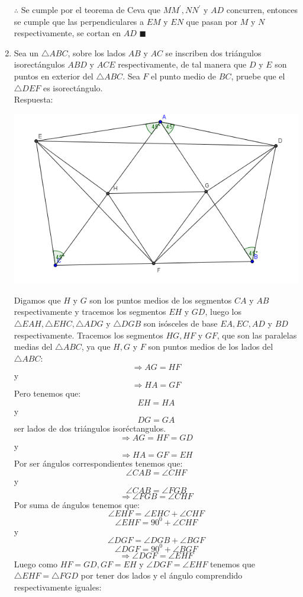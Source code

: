 \documentclass{book}
\begin{document}
\begin{enumerate}
$\therefore$ Se cumple por el teorema de Ceva que $MM^{'},NN^{'}$ y $AD$ concurren, entonces se cumple que las perpendiculares a $EM$ y $EN$ que pasan por $M$ y $N$ respectivamente, se cortan en $AD$ $\blacksquare$\\
				\item Sea un $\triangle ABC$, sobre los lados $AB$ y $AC$ se inscriben dos triángulos isorectángulos $ABD$ y $ACE$ respectivamente, de tal manera que $D$ y $E$ son puntos en exterior del $\triangle ABC$. Sea $F$ el punto medio de $BC$, pruebe que el $\triangle DEF$ es isorectángulo.\\
					Respuesta:
					\begin{center}
						\includegraphics[scale=1]{imagenes/Geometria/20.png}
					\end{center}
					Digamos que $H$ y $G$  son los puntos medios de los segmentos $CA$ y $AB$ respectivamente y tracemos los segmentos $EH$ y $GD$, luego los $\triangle EAH,\triangle EHC,\triangle ADG$ y $\triangle DGB$ son isósceles de base $EA,EC,AD$ y $BD$ respectivamente.
Tracemos los segmentos $HG,HF$ y $GF$, que son las paralelas medias del $\triangle ABC$, ya que $H,G$ y $F$ son puntos medios de los lados del $\triangle ABC$:
$$\Rightarrow AG=HF$$
y
$$\Rightarrow HA=GF$$
Pero tenemos que:
$$EH=HA$$
y
$$DG=GA$$
ser lados de dos triángulos isoréctangulos.
$$\Rightarrow AG=HF=GD$$
y
$$\Rightarrow HA=GF=EH$$
Por ser ángulos correspondientes tenemos que:
$$\angle CAB=\angle CHF$$
y
$$\angle CAB=\angle FGB$$
$$\Rightarrow\angle FGB=\angle CHF$$
Por suma de ángulos tenemos que:
$$\angle EHF=\angle EHC+\angle CHF$$
$$\angle EHF=90^0+\angle CHF$$
y
$$\angle DGF=\angle DGB+\angle BGF$$
$$\angle DGF=90^0+\angle BGF$$
$$\Rightarrow\angle DGF=\angle EHF$$
Luego como $HF=GD,GF=EH$ y $\angle DGF=\angle EHF$ tenemos que $\triangle EHF=\triangle FGD$ por tener dos lados y el ángulo comprendido respectivamente iguales:

\end{enumerate}
\end{document}
